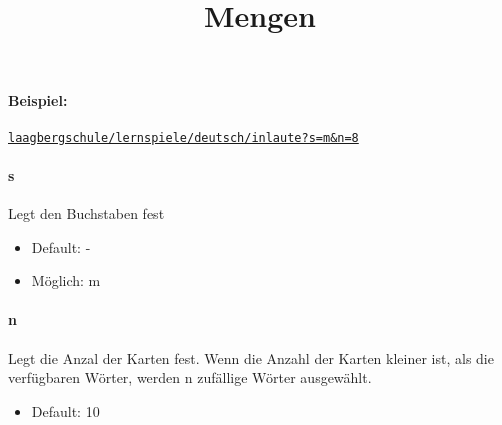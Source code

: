 \documentclass[]{article}
\title{Mengen}
\begin{document}
\maketitle

\paragraph{Beispiel:}
\texttt{\href{laagbergschule/lernspiele/deutsch/inlaute?s=m\&n=8}{laagbergschule/lernspiele/deutsch/inlaute?s=m\&n=8}} \\
\begin{multicols}{2}

	\paragraph{s}  Legt den Buchstaben fest
	\begin{itemize}
		\item Default: -
		\item Möglich: m
	\end{itemize}

	\paragraph{n} Legt die Anzal der Karten fest. Wenn die Anzahl der Karten kleiner ist, als die verfügbaren Wörter, werden n zufällige Wörter ausgewählt.
	\begin{itemize}
		\item Default: 10
	\end{itemize}


	\end{multicols}
\end{document}
